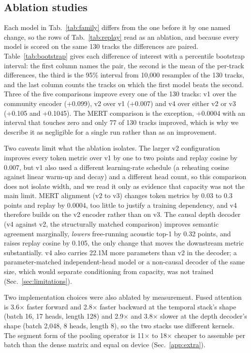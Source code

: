 \subsection{Ablation studies}

Each model in Tab.~\ref{tab:family} differs from the one before it by one named change, so the rows of Tab.~\ref{tab:replay} read as an ablation, and because every model is scored on the same 130 tracks the differences are paired. Table~\ref{tab:bootstrap} gives each difference of interest with a percentile bootstrap interval: the first column names the pair, the second is the mean of the per-track differences, the third is the 95\% interval from 10,000 resamples of the 130 tracks, and the last column counts the tracks on which the first model beats the second. Three of the five comparisons improve every one of the 130 tracks: v1 over the community encoder (+0.099), v2 over v1 (+0.007) and v4 over either v2 or v3 (+0.105 and +0.1045). The MERT comparison is the exception, +0.0004 with an interval that touches zero and only 77 of 130 tracks improved, which is why we describe it as negligible for a single run rather than as an improvement.



Two caveats limit what the ablation isolates. The larger v2 configuration improves every token metric over v1 by one to two points and replay cosine by 0.007, but v1 also used a different learning-rate schedule (a reheating cosine against linear warm-up and decay) and a different head count, so this comparison does not isolate width, and we read it only as evidence that capacity was not the main limit. MERT alignment (v2 to v3) changes token metrics by 0.03 to 0.3 points and replay by 0.0004, too little to justify a training dependency, and v4 therefore builds on the v2 encoder rather than on v3. The causal depth decoder (v4 against v2, the structurally matched comparison) improves semantic agreement marginally, \emph{lowers} free-running acoustic top-1 by 0.32 points, and raises replay cosine by 0.105, the only change that moves the downstream metric substantially. v4 also carries 22.1M more parameters than v2 in the decoder; a parameter-matched independent-head model or a non-causal decoder of the same size, which would separate conditioning from capacity, was not trained (Sec.~\ref{sec:limitations}).

Two implementation choices were also ablated by measurement. Fused attention is 3.6$\times$ faster forward and 2.8$\times$ faster backward at the temporal stack's shape (batch 16, 17 heads, length 128) and 2.9$\times$ and 3.8$\times$ slower at the depth decoder's shape (batch 2,048, 8 heads, length 8), so the two stacks use different kernels. The segment form of the pooling operator is 11$\times$ to 18$\times$ cheaper to assemble per batch than the dense matrix and equal on device (Sec.~\ref{app:extra}).
